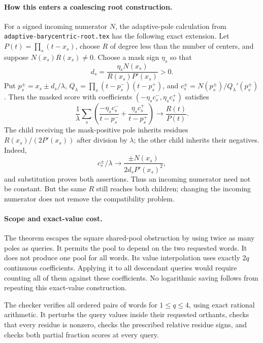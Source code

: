 \documentclass[11pt]{article}
\begin{document}
\paragraph{How this enters a coalescing root construction.}
For a signed incoming numerator $N$, the adaptive-pole calculation
from \texttt{adaptive-barycentric-root.tex} has the following exact
extension. Let $P(t)=\prod_s(t-x_s)$, choose $R$ of degree less
than the number of centers, and suppose $N(x_s)R(x_s)\ne0$.
Choose a mask sign $\eta_s$ so that
\[
 d_s=\frac{\eta_sN(x_s)}{R(x_s)P'(x_s)}>0.
\]
Put $p_s^\pm=x_s\pm d_s/\lambda$, $Q_\lambda=
\prod_s(t-p_s^-)(t-p_s^+)$, and
$c_s^\pm=N(p_s^\pm)/Q_\lambda'(p_s^\pm)$.
Then the masked score with coefficients
$(-\eta_s c_s^-,\eta_s c_s^+)$ satisfies
\[
 \frac1\lambda\sum_s\left(
 \frac{-\eta_s c_s^-}{t-p_s^-}
 +\frac{\eta_s c_s^+}{t-p_s^+}\right)
 \longrightarrow \frac{R(t)}{P(t)}.                         \tag{2}
\]
The child receiving the mask-positive pole inherits residues
$R(x_s)/(2P'(x_s))$ after division by $\lambda$; the other child
inherits their negatives. Indeed,
\[
 c_s^\pm/\lambda\longrightarrow
 \frac{\pm N(x_s)}{2d_sP'(x_s)^2},
\]
and substitution proves both assertions. Thus an incoming numerator
need not be constant. But the same $R$ still reaches both children;
changing the incoming numerator does not remove the compatibility
problem.

\paragraph{Scope and exact-value cost.}
The theorem escapes the square shared-pool obstruction by using twice
as many poles as queries. It permits the pool to depend on the two
requested words. It does not produce one pool for all words.
Its value interpolation uses exactly $2q$ continuous coefficients.
Applying it to all descendant queries would require counting all of
them against these coefficients. No logarithmic saving follows from
repeating this exact-value construction.

The checker verifies all ordered pairs of words for $1\leq q\leq4$,
using exact rational arithmetic. It perturbs the query values inside
their requested orthants, checks that every residue is nonzero, checks
the prescribed relative residue signs, and checks both partial
fraction scores at every query.
\end{document}
